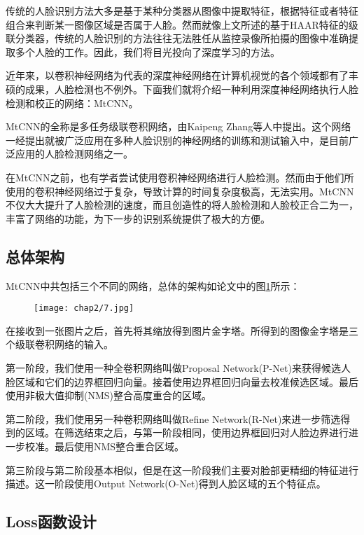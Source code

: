 传统的人脸识别方法大多是基于某种分类器从图像中提取特征，根据特征或者特征组合来判断某一图像区域是否属于人脸。然而就像上文所述的基于HAAR特征的级联分类器，传统的人脸识别的方法往往无法胜任从监控录像所拍摄的图像中准确提取多个人脸的工作。因此，我们将目光投向了深度学习的方法。

近年来，以卷积神经网络为代表的深度神经网络在计算机视觉的各个领域都有了丰硕的成果，人脸检测也不例外。下面我们就将介绍一种利用深度神经网络执行人脸检测和校正的网络：MtCNN\cite{zhang2016joint}。

MtCNN的全称是多任务级联卷积网络，由Kaipeng Zhang等人中提出。这个网络一经提出就被广泛应用在多种人脸识别的神经网络的训练和测试输入中，是目前广泛应用的人脸检测网络之一。

在MtCNN之前，也有学者尝试使用卷积神经网络进行人脸检测。然而由于他们所使用的卷积神经网络过于复杂，导致计算的时间复杂度极高，无法实用\cite{yang2015facial}。MtCNN不仅大大提升了人脸检测的速度，而且创造性的将人脸检测和人脸校正合二为一，丰富了网络的功能，为下一步的识别系统提供了极大的方便。

\subsection{总体架构}

MtCNN中共包括三个不同的网络，总体的架构如论文\parencite{zhang2016joint}中的图\ref{fig:mtcnn}所示：

\begin{figure}[!htp]
	\centering
	\texttt{[image: chap2/7.jpg]}
	\label{fig:mtcnn}
\end{figure}

在接收到一张图片之后，首先将其缩放得到图片金字塔。所得到的图像金字塔是三个级联卷积网络的输入。

第一阶段，我们使用一种全卷积网络叫做Proposal Network(P-Net)来获得候选人脸区域和它们的边界框回归向量。接着使用边界框回归向量去校准候选区域。最后使用非极大值抑制(NMS)整合高度重合的区域。

第二阶段，我们使用另一种卷积网络叫做Refine Network(R-Net)来进一步筛选得到的区域。在筛选结束之后，与第一阶段相同，使用边界框回归对人脸边界进行进一步校准。最后使用NMS整合重合区域。

第三阶段与第二阶段基本相似，但是在这一阶段我们主要对脸部更精细的特征进行描述。这一阶段使用Output Network(O-Net)得到人脸区域的五个特征点。

\subsection{Loss函数设计}

